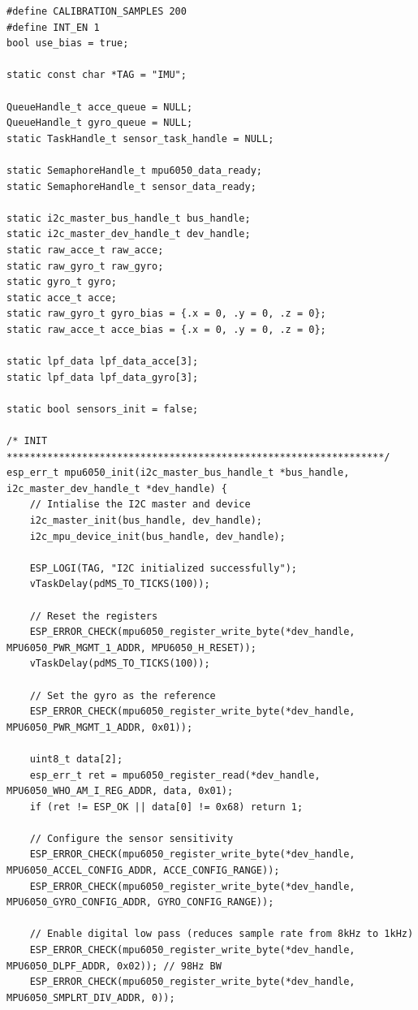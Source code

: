\begin{lstlisting}[caption={sensors.c}]
#define CALIBRATION_SAMPLES 200
#define INT_EN 1
bool use_bias = true;

static const char *TAG = "IMU";

QueueHandle_t acce_queue = NULL;
QueueHandle_t gyro_queue = NULL;
static TaskHandle_t sensor_task_handle = NULL;

static SemaphoreHandle_t mpu6050_data_ready;
static SemaphoreHandle_t sensor_data_ready;

static i2c_master_bus_handle_t bus_handle;
static i2c_master_dev_handle_t dev_handle;
static raw_acce_t raw_acce; 
static raw_gyro_t raw_gyro;
static gyro_t gyro;
static acce_t acce;
static raw_gyro_t gyro_bias = {.x = 0, .y = 0, .z = 0};
static raw_acce_t acce_bias = {.x = 0, .y = 0, .z = 0};

static lpf_data lpf_data_acce[3];
static lpf_data lpf_data_gyro[3];

static bool sensors_init = false;

/* INIT *****************************************************************/
esp_err_t mpu6050_init(i2c_master_bus_handle_t *bus_handle, i2c_master_dev_handle_t *dev_handle) {
    // Intialise the I2C master and device
    i2c_master_init(bus_handle, dev_handle);
    i2c_mpu_device_init(bus_handle, dev_handle);

    ESP_LOGI(TAG, "I2C initialized successfully");
    vTaskDelay(pdMS_TO_TICKS(100)); 
    
    // Reset the registers
    ESP_ERROR_CHECK(mpu6050_register_write_byte(*dev_handle, MPU6050_PWR_MGMT_1_ADDR, MPU6050_H_RESET));
    vTaskDelay(pdMS_TO_TICKS(100)); 
    
    // Set the gyro as the reference
    ESP_ERROR_CHECK(mpu6050_register_write_byte(*dev_handle, MPU6050_PWR_MGMT_1_ADDR, 0x01));

    uint8_t data[2];
    esp_err_t ret = mpu6050_register_read(*dev_handle, MPU6050_WHO_AM_I_REG_ADDR, data, 0x01);
    if (ret != ESP_OK || data[0] != 0x68) return 1;
        
    // Configure the sensor sensitivity
    ESP_ERROR_CHECK(mpu6050_register_write_byte(*dev_handle, MPU6050_ACCEL_CONFIG_ADDR, ACCE_CONFIG_RANGE));
    ESP_ERROR_CHECK(mpu6050_register_write_byte(*dev_handle, MPU6050_GYRO_CONFIG_ADDR, GYRO_CONFIG_RANGE));

    // Enable digital low pass (reduces sample rate from 8kHz to 1kHz)
    ESP_ERROR_CHECK(mpu6050_register_write_byte(*dev_handle, MPU6050_DLPF_ADDR, 0x02)); // 98Hz BW
    ESP_ERROR_CHECK(mpu6050_register_write_byte(*dev_handle, MPU6050_SMPLRT_DIV_ADDR, 0));


\end{lstlisting}
